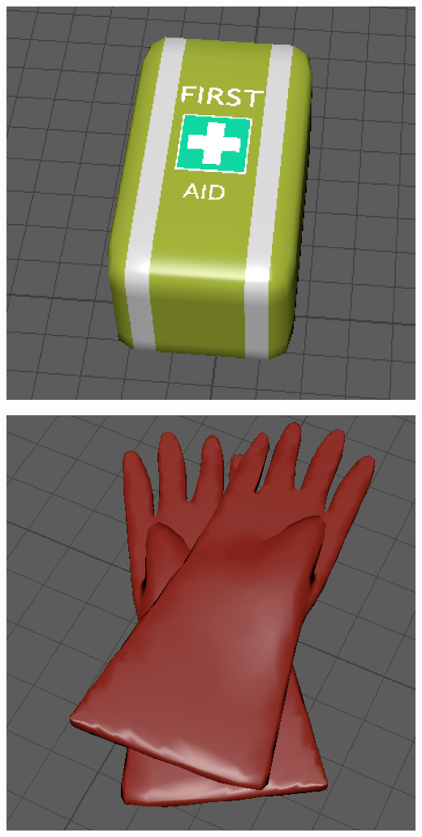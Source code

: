 \documentclass[ %
                    author={Elis Jones},
                supervisor={Dr. Kirsten Cater},
                    degree={BSc},
                     title={The Effect of Presentation Medium on Spatial Cognition},
                  subtitle={in the Virtual Environment},
                      year={2018} ]{dissertation}
\begin{document}
\begin{minipage}{\textwidth}
\begin{center}
\begin{minipage}{0.25\textwidth}
        \includegraphics[width=1\textwidth]{images/firstaid.png}
    \end{minipage}\hfill
\end{center}
\begin{center}
    \centering
    \begin{minipage}{0.25\textwidth}
        \centering
        \includegraphics[width=1\textwidth]{images/gloves.png}

\end{minipage}
\end{center}
\end{minipage}
\end{document}
